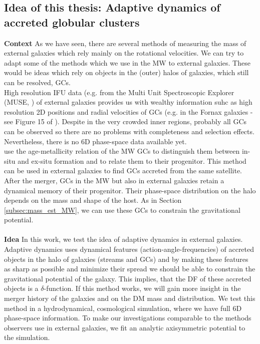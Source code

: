 \subsection{Idea of this thesis: Adaptive dynamics of accreted globular clusters}
\textbf{Context}
As we have seen, there are several methods of measuring the mass of external galaxies which rely mainly on the rotational velocities. We can try to adapt some of the methods which we use in the \ac{MW} to external galaxies. These would be ideas which rely on objects in the (outer) halos of galaxies, which still can be resolved, \acp{GC}. 
\\
High resolution \ac{IFU} data (e.g. from the Multi Unit Spectroscopic Explorer (MUSE, \citealp{Bacon...MUSE...2010}) of external galaxies provides us with wealthy information suhc as high resolution 2D positions and radial velocities of \acp{GC} (e.g. in the Fornax galaxies - see Figure 15 of \citealp{Sarzi...Fornax3d....2018}). Despite in the very crowded inner regions, probably all \acp{GC} can be observed so there are no problems with completeness and selection effects. Nevertheless, there is no 6D phase-space data available yet. 
\\
\citet{Leaman...agemetall.MWGCs...2013} use the age-metallicity relation of the \ac{MW} \acp{GC} to distinguish them between in-situ and ex-situ formation and to relate them to their progenitor. This method can be used in external galaxies to find \acp{GC} accreted from the same satellite.
\\
After the merger, \acp{GC} in the \ac{MW} but also in external galaxies retain a dynamical memory of their progenitor. Their phase-space distribution on the halo depends on the mass and shape of the host. As in Section \ref{subsec:mass_est_MW}, we can use these \acp{GC} to constrain the gravitational potential.
\\\\
\textbf{Idea}
In this work, we test the idea of adaptive dynamics \citep{Binney...adaptivedynamics...2005} in external galaxies. Adaptive dynamics uses dynamical features (action-angle-frequencies) of accreted objects in the halo of galaxies (streams and \acp{GC}) and by making these features as sharp as possible and minimize their spread we should be able to constrain the gravitational potential of the galaxy. This implies, that the \ac{DF} of these accreted objects is a $\delta$-function. If this method works, we will gain more insight in the merger history of the galaxies and on the \ac{DM} mass and distribution. We test this method in a hydrodynamical, cosmological simulation, where we have full 6D phase-space information. To make our investigations comparable to the methods observers use in external galaxies, we fit an analytic axisymmetric potential to the simulation.
